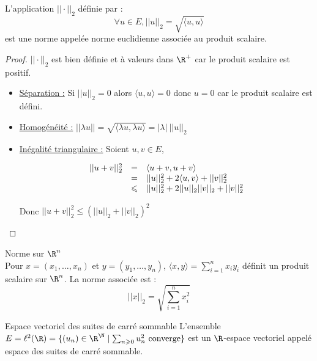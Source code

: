 \begin{theoreme}{}{}
    L'application $|| \cdot ||_2$ définie par : 
    \[\forall u \in E, ||u||_2 = \sqrt{\langle u, u \rangle}\]
    est une norme appelée norme euclidienne associée au produit scalaire. 
\end{theoreme}


\begin{proof}
    $|| \cdot ||_2$ est bien définie et à valeurs dans $\R^+$ car le produit scalaire est positif. 

    \begin{itemize}
        \item \uline{Séparation :} Si $||u||_2 = 0 $ alors $\langle u, u \rangle = 0$ donc $u = 0$ car le produit scalaire est défini. 

        \item \uline{Homogénéité :} $||\lambda u|| = \sqrt{\langle \lambda u, \lambda u\rangle} = |\lambda| ~ ||u||_2$

        \item \uline{Inégalité triangulaire :} Soient $u, v \in E$,

        \[
            \begin{array}{rcl}
                ||u + v ||^2_2 & = & \langle u + v , u + v \rangle \\
                \space & = & ||u||_2^2 + 2 \langle u, v \rangle + ||v||_2^2 \\
                \space & \leqslant & ||u||_2^2 + 2 ||u||_2||v||_2 + ||v||_2^2 \\
            \end{array}
        \]

        Donc $||u + v||_2^2 \leqslant (||u||_2 + ||v||_2)^2$
    \end{itemize}
\end{proof}

\begin{definition}{Norme sur $\R^n$}{}
    \\Pour $x = (x_1, \dots, x_n)$ et $y = (y_1, \dots, y_n)$, $\displaystyle \langle x, y \rangle = \sum_{i = 1 }^{n }x_i y_i$ définit un 
    produit scalaire sur $\R^n$. La norme associée est :
    \[||x||_2 = \sqrt{\sum_{i = 1 }^{n }x_i^2}\]
\end{definition}

\begin{theoreme}{Espace vectoriel des suites de carré sommable}{}
    L'ensemble $E = \ell^2(\R) = \{(u_n) \in \R^{\N} \mid \sum_{n \geqslant 0 }u_n^2 \text{ converge}\}$
    est un $\R$-espace vectoriel appelé espace des suites de carré sommable. 
\end{theoreme}

